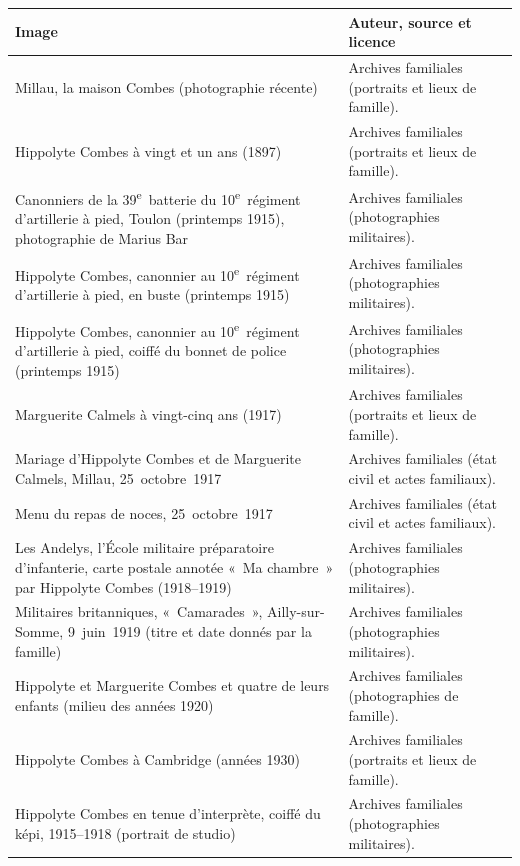 {\footnotesize
\setlength{\tabcolsep}{3pt}
\renewcommand{\arraystretch}{1.12}
\begin{longtable}{@{}>{\raggedright\arraybackslash}p{50mm}>{\raggedright\arraybackslash}p{88mm}@{}}
\toprule
\textbf{Image} & \textbf{Auteur, source et licence}\\
\midrule\endhead
\bottomrule\endfoot
Millau, la maison Combes (photographie récente) & Archives familiales (portraits et lieux de famille).\\
Hippolyte Combes à vingt et un ans (1897) & Archives familiales (portraits et lieux de famille).\\
Canonniers de la 39\textsuperscript{e}~batterie du 10\textsuperscript{e}~régiment d'artillerie à pied, Toulon (printemps 1915), photographie de Marius Bar & Archives familiales (photographies militaires).\\
Hippolyte Combes, canonnier au 10\textsuperscript{e}~régiment d'artillerie à pied, en buste (printemps 1915) & Archives familiales (photographies militaires).\\
Hippolyte Combes, canonnier au 10\textsuperscript{e}~régiment d'artillerie à pied, coiffé du bonnet de police (printemps 1915) & Archives familiales (photographies militaires).\\
Marguerite Calmels à vingt-cinq ans (1917) & Archives familiales (portraits et lieux de famille).\\
Mariage d'Hippolyte Combes et de Marguerite Calmels, Millau, 25~octobre~1917 & Archives familiales (état civil et actes familiaux).\\
Menu du repas de noces, 25~octobre~1917 & Archives familiales (état civil et actes familiaux).\\
Les Andelys, l'École militaire préparatoire d'infanterie, carte postale annotée «~Ma chambre~» par Hippolyte Combes (1918–1919) & Archives familiales (photographies militaires).\\
Militaires britanniques, «~Camarades~», Ailly-sur-Somme, 9~juin~1919 (titre et date donnés par la famille) & Archives familiales (photographies militaires).\\
Hippolyte et Marguerite Combes et quatre de leurs enfants (milieu des années 1920) & Archives familiales (photographies de famille).\\
Hippolyte Combes à Cambridge (années 1930) & Archives familiales (portraits et lieux de famille).\\
Hippolyte Combes en tenue d'interprète, coiffé du képi, 1915–1918 (portrait de studio) & Archives familiales (photographies militaires).\\

\end{longtable}}
